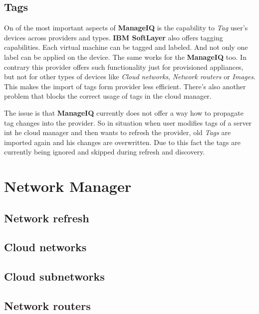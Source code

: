 \subsection{Tags}
\label{sub:Tags}

On of the most important aspects of \textbf{ManageIQ} is the capability to \emph{Tag} user's devices across providers and types. \textbf{IBM SoftLayer} also offers tagging capabilities. Each virtual machine can be tagged and labeled. And not only one label can be applied on the device. The same works for the \textbf{ManageIQ} too. In contrary this provider offers such functionality just for provisioned appliances, but not for other types of devices like \emph{Cloud networks}, \emph{Network routers} or \emph{Images}. This makes the import of tags form provider less efficient. There's also another problem that blocks the correct usage of tags in the cloud manager.

The issue is that \textbf{ManageIQ} currently does not offer a way how to propagate tag changes into the provider. So in situation when user modifies tags of a server int he cloud manager and then wants to refresh the provider, old \emph{Tags} are imported again and his changes are overwritten. Due to this fact the tags are currently being ignored and skipped during refresh and discovery.

\section{Network Manager}
\label{sec:Network Manager}

\subsection{Network refresh}
\label{sub:Network refresh}

\subsection{Cloud networks}
\label{sub:Cloud networks}

\subsection{Cloud subnetworks}
\label{sub:Cloud subnetworks}

\subsection{Network routers}
\label{sub:Network routers}

